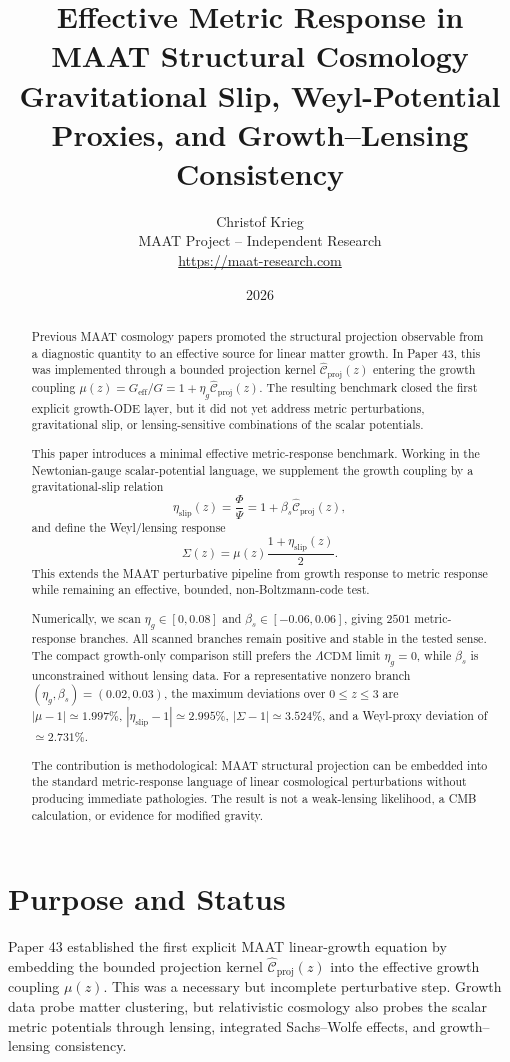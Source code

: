 \documentclass[11pt,a4paper]{article}
\title{
\textbf{Effective Metric Response in MAAT Structural Cosmology}\\[0.4em]
\large Gravitational Slip, Weyl-Potential Proxies, and Growth--Lensing Consistency
}
\author{
Christof Krieg\\
\small MAAT Project -- Independent Research\\
\small \url{https://maat-research.com}
}
\date{2026}
\newcommand{\LCDM}{\Lambda\mathrm{CDM}}
\newcommand{\Chatproj}{\widehat{\mathcal{C}}_{\mathrm{proj}}}
\newcommand{\Geff}{G_{\mathrm{eff}}}
\newcommand{\etaslip}{\eta_{\mathrm{slip}}}
\begin{document}
\maketitle

\begin{abstract}
Previous MAAT cosmology papers promoted the structural projection observable
from a diagnostic quantity to an effective source for linear matter growth.
In Paper 43, this was implemented through a bounded projection kernel
$\Chatproj(z)$ entering the growth coupling
$\mu(z)=\Geff/G=1+\eta_g\Chatproj(z)$.
The resulting benchmark closed the first explicit growth-ODE layer, but it did
not yet address metric perturbations, gravitational slip, or lensing-sensitive
combinations of the scalar potentials.

This paper introduces a minimal effective metric-response benchmark.
Working in the Newtonian-gauge scalar-potential language, we supplement the
growth coupling by a gravitational-slip relation
\[
\etaslip(z)=\frac{\Phi}{\Psi}=1+\beta_s\Chatproj(z),
\]
and define the Weyl/lensing response
\[
\Sigma(z)=\mu(z)\frac{1+\etaslip(z)}{2}.
\]
This extends the MAAT perturbative pipeline from growth response to metric
response while remaining an effective, bounded, non-Boltzmann-code test.

Numerically, we scan
$\eta_g\in[0,0.08]$ and $\beta_s\in[-0.06,0.06]$, giving $2501$ metric-response
branches.
All scanned branches remain positive and stable in the tested sense.
The compact growth-only comparison still prefers the $\LCDM$ limit
$\eta_g=0$, while $\beta_s$ is unconstrained without lensing data.
For a representative nonzero branch
$(\eta_g,\beta_s)=(0.02,0.03)$, the maximum deviations over $0\le z\le3$ are
$|\mu-1|\simeq1.997\%$, $|\etaslip-1|\simeq2.995\%$,
$|\Sigma-1|\simeq3.524\%$, and a Weyl-proxy deviation of
$\simeq2.731\%$.

The contribution is methodological: MAAT structural projection can be embedded
into the standard metric-response language of linear cosmological
perturbations without producing immediate pathologies.
The result is not a weak-lensing likelihood, a CMB calculation, or evidence for
modified gravity.
\end{abstract}

\section{Purpose and Status}

Paper 43 established the first explicit MAAT linear-growth equation by
embedding the bounded projection kernel $\Chatproj(z)$ into the effective
growth coupling $\mu(z)$.
This was a necessary but incomplete perturbative step.
Growth data probe matter clustering, but relativistic cosmology also probes
the scalar metric potentials through lensing, integrated Sachs--Wolfe effects,
and growth--lensing consistency.
\end{document}
